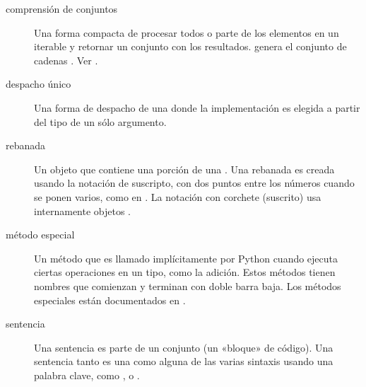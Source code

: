 \documentclass[a4,10pt,spanish]{sphinxmanual}
\begin{document}
\begin{description}
\item[{comprensión de conjuntos\label{\detokenize{glossary:term-set-comprehension}}}] \leavevmode
\sphinxAtStartPar
Una forma compacta de procesar todos o parte de los elementos en un iterable y retornar un conjunto con los resultados.  genera el conjunto de cadenas . Ver .

\item[{despacho único\label{\detokenize{glossary:term-single-dispatch}}}] \leavevmode
\sphinxAtStartPar
Una forma de despacho de una {\hyperref[\detokenize{glossary:term-generic-function}]{}} donde la implementación es elegida a partir del tipo de un sólo argumento.

\item[{rebanada\label{\detokenize{glossary:term-slice}}}] \leavevmode
\sphinxAtStartPar
Un objeto que contiene una porción de una {\hyperref[\detokenize{glossary:term-sequence}]{}}.  Una rebanada es creada usando la notación de suscripto, \sphinxcode{\sphinxupquote{{[}{]}}} con dos puntos entre los números cuando se ponen varios, como en .  La notación con corchete (suscrito) usa internamente objetos .

\item[{método especial\label{\detokenize{glossary:term-special-method}}}] \leavevmode
{}\ignorespaces 
\sphinxAtStartPar
Un método que es llamado implícitamente por Python cuando ejecuta ciertas operaciones en un tipo, como la adición.  Estos métodos tienen nombres que comienzan y terminan con doble barra baja.  Los métodos especiales están documentados en .

\item[{sentencia\label{\detokenize{glossary:term-statement}}}] \leavevmode
\sphinxAtStartPar
Una sentencia es parte de un conjunto (un «bloque» de código).  Una sentencia tanto es una {\hyperref[\detokenize{glossary:term-expression}]{}}  como alguna de las varias sintaxis usando una palabra clave, como ,  o .


\end{description}
\end{document}

